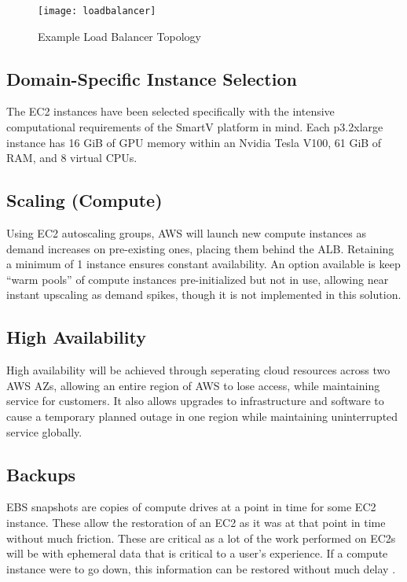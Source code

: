 \begin{figure}[H]\label{fig:loadbalancer}
    \centering
    \texttt{[image: loadbalancer]}
    \caption{Example Load Balancer Topology}
\end{figure}

\subsection{Domain-Specific Instance Selection}

The EC2 instances have been selected specifically with the intensive computational requirements of the SmartV platform in mind. Each p3.2xlarge instance has 16 GiB of GPU memory within an Nvidia Tesla V100, 61 GiB of RAM, and 8 virtual CPUs.

\subsection{Scaling (Compute)}

Using EC2 autoscaling groups, AWS will launch new compute instances as demand increases on pre-existing ones, placing them behind the ALB. Retaining a minimum of 1 instance ensures constant availability. An option available is keep ``warm pools'' of compute instances pre-initialized but not in use, allowing near instant upscaling as demand spikes, though it is not implemented in this solution.

\subsection{High Availability}

High availability will be achieved through seperating cloud resources across two AWS AZs, allowing an entire region of AWS to lose access, while maintaining service for customers. It also allows upgrades to infrastructure and software to cause a temporary planned outage in one region while maintaining uninterrupted service globally.

\subsection{Backups}

EBS snapshots are copies of compute drives at a point in time for some EC2 instance. These allow the restoration of an EC2 as it was at that point in time without much friction. These are critical as a lot of the work performed on EC2s will be with ephemeral data that is critical to a user's experience. If a compute instance were to go down, this information can be restored without much delay \autocite{amazonwebservicesAmazonEBS2023}.

